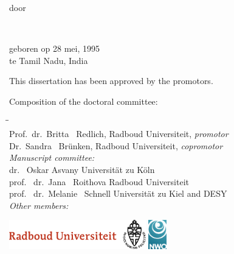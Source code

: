 \begin{titlepage}
\begin{center}
        \bigskip
        \bigskip

        door

        \bigskip
        \bigskip

        \makeatletter
        {\Large\titlefont\bfseries\@firstnames\ \MakeUppercase{\titleshape\@lastname}}
        \makeatother

        \bigskip
        \bigskip

        geboren op 28 mei, 1995\\
        te Tamil Nadu, India\\

        \vspace*{2\bigskipamount}

    \end{center}

    \clearpage
    \thispagestyle{empty}

    \noindent This dissertation has been approved by the promotors.

    \bigskip
    \noindent Composition of the doctoral committee:
    
    \begin{tabbing}
        \hspace{\tabcolsep}\=\hspace{0.33\textwidth}\=\hspace{0.66\textwidth}                   \\[-3\medskipamount]
        \> Prof.\ dr.\ Britta \ Redlich,    \> Radboud Universiteit, \textit{promotor}      \\
        \> Dr.\ Sandra \ Br\"unken,        \> Radboud Universiteit, \textit{copromotor}    \\[\medskipamount]
        \>\textit{Manuscript committee:}  \\[\smallskipamount]
        \> dr. \ Oskar Asvany            \> Universit\"at zu K\"oln \\
        \> prof. \ dr.\ Jana \ Roithova            \> Radboud Universiteit \\
        \> prof. \ dr.\ Melanie \ Schnell   \> Universit\"at zu Kiel and DESY \\[\medskipamount]
        \>\textit{Other members:} \\[\smallskipamount]
    \end{tabbing}

    \medskip

    \vfill
    \begin{center}
        \includegraphics[height=0.5in]{_logos/Logo_RU_NL_RGB.pdf}
        \hspace{2em}
        \includegraphics[height=0.5in]{_logos/NWO.jpg}
    \end{center}
    \vfill
    \noindent


\end{titlepage}
